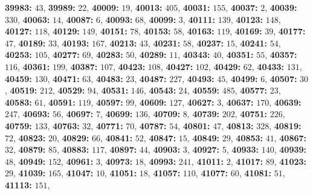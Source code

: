 \textsf{\bfseries 39983:} $43$, \textsf{\bfseries 39989:} $22$, \textsf{\bfseries 40009:} $19$, \textsf{\bfseries 40013:} $405$, \textsf{\bfseries 40031:} $155$, \textsf{\bfseries 40037:} $2$, \textsf{\bfseries 40039:} $330$, \textsf{\bfseries 40063:} $14$, \textsf{\bfseries 40087:} $6$, \textsf{\bfseries 40093:} $68$, \textsf{\bfseries 40099:} $3$, \textsf{\bfseries 40111:} $139$, \textsf{\bfseries 40123:} $148$, \textsf{\bfseries 40127:} $118$, \textsf{\bfseries 40129:} $149$, \textsf{\bfseries 40151:} $78$, \textsf{\bfseries 40153:} $58$, \textsf{\bfseries 40163:} $119$, \textsf{\bfseries 40169:} $39$, \textsf{\bfseries 40177:} $47$, \textsf{\bfseries 40189:} $33$, \textsf{\bfseries 40193:} $167$, \textsf{\bfseries 40213:} $43$, \textsf{\bfseries 40231:} $58$, \textsf{\bfseries 40237:} $15$, \textsf{\bfseries 40241:} $54$, \textsf{\bfseries 40253:} $105$, \textsf{\bfseries 40277:} $69$, \textsf{\bfseries 40283:} $50$, \textsf{\bfseries 40289:} $11$, \textsf{\bfseries 40343:} $40$, \textsf{\bfseries 40351:} $55$, \textsf{\bfseries 40357:} $116$, \textsf{\bfseries 40361:} $199$, \textsf{\bfseries 40387:} $107$, \textsf{\bfseries 40423:} $108$, \textsf{\bfseries 40427:} $102$, \textsf{\bfseries 40429:} $62$, \textsf{\bfseries 40433:} $131$, \textsf{\bfseries 40459:} $130$, \textsf{\bfseries 40471:} $63$, \textsf{\bfseries 40483:} $23$, \textsf{\bfseries 40487:} $227$, \textsf{\bfseries 40493:} $45$, \textsf{\bfseries 40499:} $6$, \textsf{\bfseries 40507:} $30$, \textsf{\bfseries 40519:} $212$, \textsf{\bfseries 40529:} $94$, \textsf{\bfseries 40531:} $146$, \textsf{\bfseries 40543:} $24$, \textsf{\bfseries 40559:} $485$, \textsf{\bfseries 40577:} $23$, \textsf{\bfseries 40583:} $61$, \textsf{\bfseries 40591:} $119$, \textsf{\bfseries 40597:} $99$, \textsf{\bfseries 40609:} $127$, \textsf{\bfseries 40627:} $3$, \textsf{\bfseries 40637:} $170$, \textsf{\bfseries 40639:} $247$, \textsf{\bfseries 40693:} $56$, \textsf{\bfseries 40697:} $7$, \textsf{\bfseries 40699:} $136$, \textsf{\bfseries 40709:} $8$, \textsf{\bfseries 40739:} $202$, \textsf{\bfseries 40751:} $226$, \textsf{\bfseries 40759:} $133$, \textsf{\bfseries 40763:} $32$, \textsf{\bfseries 40771:} $70$, \textsf{\bfseries 40787:} $54$, \textsf{\bfseries 40801:} $47$, \textsf{\bfseries 40813:} $328$, \textsf{\bfseries 40819:} $72$, \textsf{\bfseries 40823:} $20$, \textsf{\bfseries 40829:} $66$, \textsf{\bfseries 40841:} $52$, \textsf{\bfseries 40847:} $15$, \textsf{\bfseries 40849:} $29$, \textsf{\bfseries 40853:} $41$, \textsf{\bfseries 40867:} $32$, \textsf{\bfseries 40879:} $85$, \textsf{\bfseries 40883:} $117$, \textsf{\bfseries 40897:} $44$, \textsf{\bfseries 40903:} $3$, \textsf{\bfseries 40927:} $5$, \textsf{\bfseries 40933:} $140$, \textsf{\bfseries 40939:} $48$, \textsf{\bfseries 40949:} $152$, \textsf{\bfseries 40961:} $3$, \textsf{\bfseries 40973:} $18$, \textsf{\bfseries 40993:} $241$, \textsf{\bfseries 41011:} $2$, \textsf{\bfseries 41017:} $89$, \textsf{\bfseries 41023:} $29$, \textsf{\bfseries 41039:} $165$, \textsf{\bfseries 41047:} $10$, \textsf{\bfseries 41051:} $18$, \textsf{\bfseries 41057:} $110$, \textsf{\bfseries 41077:} $60$, \textsf{\bfseries 41081:} $51$, \textsf{\bfseries 41113:} $151$, 
